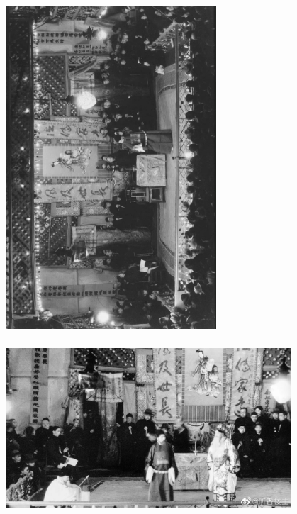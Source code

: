 \documentclass[cjk,slidestop,compress,mathserif,blue]{beamer}
\begin{document}
\frame
{
	\frametitle{}
\begin{figure}[h!]
\centering
\vspace{-0.20in}
\includegraphics[height=1.00\textwidth,width=0.70\textwidth, angle=270, clip]{Figures/PekOpe_His-3.jpg}
\label{History-3}
\end{figure}
}

\frame
{
	\frametitle{}
\begin{figure}[h!]
\centering
\vspace{-0.10in}
\includegraphics[height=0.60\textwidth,width=0.95\textwidth, clip]{Figures/PekOpe_His-4.jpg}
\label{History-4}
\end{figure}
}
\end{document}

